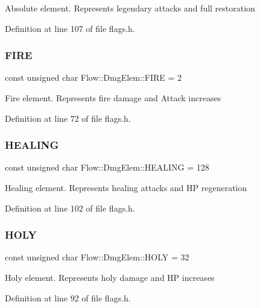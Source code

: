Absolute element. Represents legendary attacks and full restoration 

Definition at line 107 of file flags.\+h.

\hypertarget{namespace_flow_1_1_dmg_elem_aa25b22e8ba30a8c765912ceda3110cab}{}\label{namespace_flow_1_1_dmg_elem_aa25b22e8ba30a8c765912ceda3110cab} 
\subsubsection{\texorpdfstring{F\+I\+RE}{FIRE}}
{\footnotesize\ttfamily const unsigned char Flow\+::\+Dmg\+Elem\+::\+F\+I\+RE = 2}

Fire element. Represents fire damage and Attack increases 

Definition at line 72 of file flags.\+h.

\hypertarget{namespace_flow_1_1_dmg_elem_af91abc6a76da493ae0aab97998f10a3c}{}\label{namespace_flow_1_1_dmg_elem_af91abc6a76da493ae0aab97998f10a3c} 
\subsubsection{\texorpdfstring{H\+E\+A\+L\+I\+NG}{HEALING}}
{\footnotesize\ttfamily const unsigned char Flow\+::\+Dmg\+Elem\+::\+H\+E\+A\+L\+I\+NG = 128}

Healing element. Represents healing attacks and HP regeneration 

Definition at line 102 of file flags.\+h.

\hypertarget{namespace_flow_1_1_dmg_elem_a9cf12825628ffbf718079827d6706619}{}\label{namespace_flow_1_1_dmg_elem_a9cf12825628ffbf718079827d6706619} 
\subsubsection{\texorpdfstring{H\+O\+LY}{HOLY}}
{\footnotesize\ttfamily const unsigned char Flow\+::\+Dmg\+Elem\+::\+H\+O\+LY = 32}

Holy element. Represents holy damage and HP increases 

Definition at line 92 of file flags.\+h.


